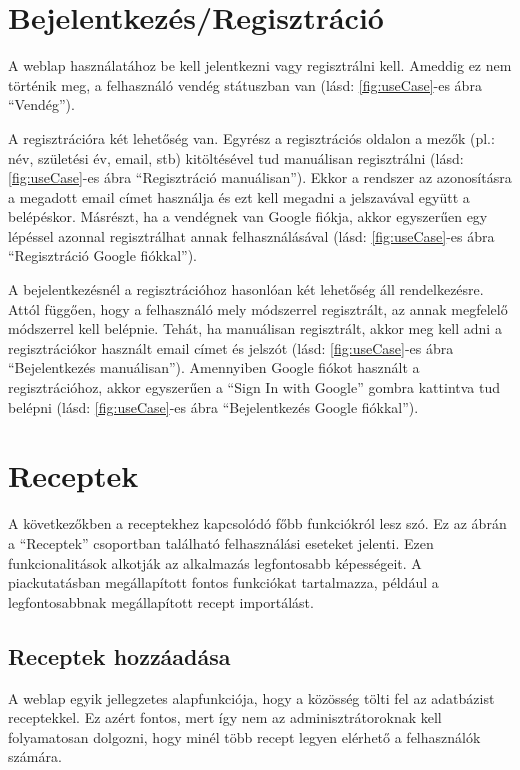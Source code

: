 \documentclass[12pt]{report}
\theoremstyle{definition}
\begin{document}
\section{Bejelentkezés/Regisztráció}
A weblap használatához be kell jelentkezni vagy regisztrálni kell. Ameddig ez nem történik meg, a felhasználó vendég státuszban van (lásd: \ref{fig:useCase}-es ábra “Vendég”). 

A regisztrációra két lehetőség van. Egyrész a regisztrációs oldalon a mezők (pl.: név, születési év, email, stb) kitöltésével tud manuálisan regisztrálni (lásd: \ref{fig:useCase}-es ábra “Regisztráció manuálisan”). Ekkor a rendszer az azonosításra a megadott email címet használja és ezt kell megadni a jelszavával együtt a belépéskor. Másrészt, ha a vendégnek van Google fiókja, akkor egyszerűen egy lépéssel azonnal regisztrálhat annak felhasználásával (lásd: \ref{fig:useCase}-es ábra “Regisztráció Google fiókkal”).

A bejelentkezésnél a regisztrációhoz hasonlóan két lehetőség áll rendelkezésre. Attól függően, hogy a felhasználó mely módszerrel regisztrált, az annak megfelelő módszerrel kell belépnie. Tehát, ha manuálisan regisztrált, akkor meg kell adni a regisztrációkor használt email címet és jelszót (lásd: \ref{fig:useCase}-es ábra “Bejelentkezés manuálisan”). Amennyiben Google fiókot használt a regisztrációhoz, akkor egyszerűen a “Sign In with Google” gombra kattintva tud belépni (lásd: \ref{fig:useCase}-es ábra “Bejelentkezés Google fiókkal”).



\section{Receptek}
A következőkben a receptekhez kapcsolódó főbb funkciókról lesz szó. Ez az ábrán a “Receptek” csoportban található felhasználási eseteket jelenti. Ezen funkcionalitások alkotják az alkalmazás legfontosabb képességeit. A piackutatásban megállapított fontos funkciókat tartalmazza, például a legfontosabbnak megállapított recept importálást.


\subsection{Receptek hozzáadása} 
A weblap egyik jellegzetes alapfunkciója, hogy a közösség tölti fel az adatbázist receptekkel. Ez azért fontos, mert így nem az adminisztrátoroknak kell folyamatosan dolgozni, hogy minél több recept legyen elérhető a felhasználók számára. 
\end{document}
